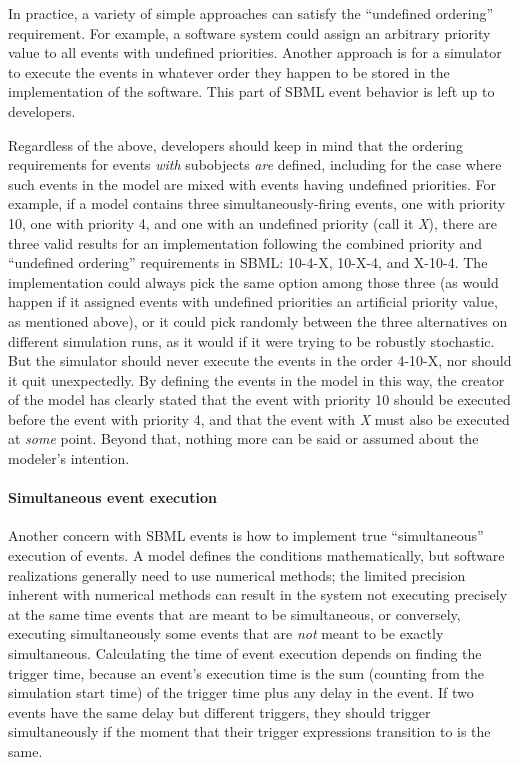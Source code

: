 In practice, a variety of simple approaches can satisfy the
``undefined ordering'' requirement.  For example, a software
system could assign an arbitrary priority value to all events with
undefined priorities.  Another approach is for a simulator to
execute the events in whatever order they happen to be stored in
the implementation of the software.  This part of SBML event
behavior is left up to developers.

Regardless of the above, developers should keep in mind that the
ordering requirements for events \emph{with} \Priority subobjects
\emph{are} defined, including for the case where such events in
the model are mixed with events having undefined priorities.  For
example, if a model contains three simultaneously-firing events,
one with priority 10, one with priority 4, and one with an
undefined priority (call it \emph{X}), there are three valid
results for an implementation following the combined priority and
``undefined ordering'' requirements in SBML: 10-4-X, 10-X-4, and
X-10-4.  The implementation could always pick the same option
among those three (as would happen if it assigned events with
undefined priorities an artificial priority value, as mentioned
above), or it could pick randomly between the three alternatives
on different simulation runs, as it would if it were trying to be
robustly stochastic.  But the simulator should never execute the
events in the order 4-10-X, nor should it quit unexpectedly.  By
defining the events in the model in this way, the creator of the
model has clearly stated that the event with priority 10 should be
executed before the event with priority 4, and that the event with
\emph{X} must also be executed at \emph{some} point.  Beyond that,
nothing more can be said or assumed about the modeler's intention.


\paragraph{Simultaneous event execution}

Another concern with SBML events is how to implement true
``simultaneous'' execution of events.  A model defines the
conditions mathematically, but software realizations generally
need to use numerical methods; the limited precision inherent with
numerical methods can result in the system not executing precisely
at the same time events that are meant to be simultaneous, or
conversely, executing simultaneously some events that are
\emph{not} meant to be exactly simultaneous.  Calculating the time
of event execution depends on finding the trigger time, because an
event's execution time is the sum (counting from the simulation
start time) of the trigger time plus any delay in the event.  If
two events have the same delay but different triggers, they should
trigger simultaneously if the moment that their trigger expressions
transition to  is the same.


